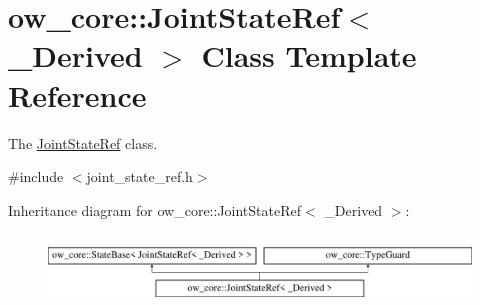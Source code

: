 \hypertarget{classow__core_1_1JointStateRef}{}\section{ow\+\_\+core\+:\+:Joint\+State\+Ref$<$ \+\_\+\+Derived $>$ Class Template Reference}
\label{classow__core_1_1JointStateRef}


The \hyperlink{classow__core_1_1JointStateRef}{Joint\+State\+Ref} class.  




{\ttfamily \#include $<$joint\+\_\+state\+\_\+ref.\+h$>$}

Inheritance diagram for ow\+\_\+core\+:\+:Joint\+State\+Ref$<$ \+\_\+\+Derived $>$\+:\begin{figure}[H]
\begin{center}
\leavevmode
\includegraphics[height=1.836066cm]{de/d8b/classow__core_1_1JointStateRef}
\end{center}
\end{figure}
